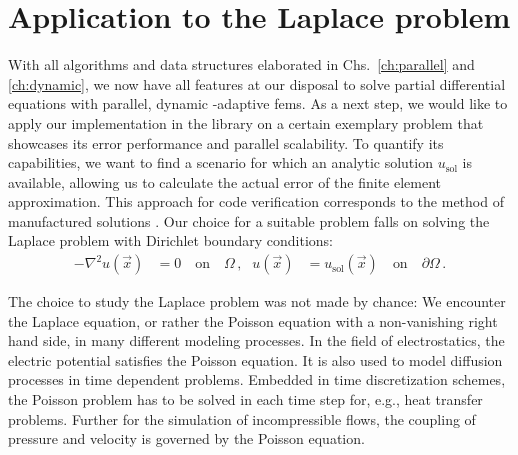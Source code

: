 \chapter{Application to the Laplace problem}
\label{ch:results}
\glsresetall


With all algorithms and data structures elaborated in Chs.~\ref{ch:parallel} and \ref{ch:dynamic}, we now have all features at our disposal to solve partial differential equations with parallel, dynamic \hp-adaptive \glspl{fem}. As a next step, we would like to apply our implementation in the \dealii{} library on a certain exemplary problem that showcases its error performance and parallel scalability. To quantify its capabilities, we want to find a scenario for which an analytic solution $u_\text{sol}$ is available, allowing us to calculate the actual error of the finite element approximation. This approach for code verification corresponds to the method of manufactured solutions \parencite{salari2000}. Our choice for a suitable problem falls on solving the Laplace problem with Dirichlet boundary conditions:
\begin{align}
- \nabla^2 u(\vec{x}) &= 0 \quad\text{on}\quad \Omega \,\text{,} & u(\vec{x}) &= u_\text{sol}(\vec{x}) \quad\text{on}\quad \partial\Omega \,\text{.}
\end{align}

The choice to study the Laplace problem was not made by chance: We encounter the Laplace equation, or rather the Poisson equation with a non-vanishing right hand side, in many different modeling processes. In the field of electrostatics, the electric potential satisfies the Poisson equation. It is also used to model diffusion processes in time dependent problems. Embedded in time discretization schemes, the Poisson problem has to be solved in each time step for, e.g., heat transfer problems. Further for the simulation of incompressible flows, the coupling of pressure and velocity is governed by the Poisson equation.


